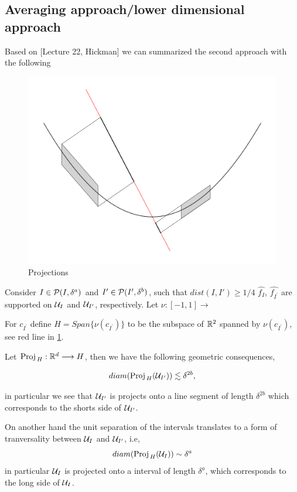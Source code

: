 \subsection{Averaging approach/lower dimensional approach}\label{subsection:Averaging approach}
Based on [Lecture 22, Hickman] we can summarized the second approach with the following  
\begin{figure}[h!]
    \centering
    \includegraphics[scale=0.6]{Pics/Proj1.png}
    \caption{Projections }
    \label{fig:projections}
\end{figure}


Consider $I\in \mathcal{P}(I,\delta^{a})$ and $I^{\prime}\in \mathcal{P}(I^{\prime},\delta^{b})$, such that $dist(I,I')\geq 1/4$ $\hat{f_{I}}$, $\hat{f_{I^{\prime}}}$ are supported on $\mathcal{U}_{I}$ and $\mathcal{U}_{I^{\prime}}$, respectively. Let $\nu:[-1,1]\xrightarrow{}$

For $c_{I^{\prime}}$ define $H = Span\{\nu(c_{I^{\prime}})\}$ to be the subspace of $\mathbb{R}^2$ spanned by $\nu(c_{I^{\prime}})$, see red line in \ref{fig:projections}.

Let $\text{Proj}_{\,H}: \mathbb{R}^{d}\longrightarrow H$, then we have the following geometric consequences,

$$diam(\text{Proj}_{\,H}(\mathcal{U}_{I^{\prime}}))\lesssim \delta^{2b},$$

in particular we see that $\mathcal{U}_{I^{\prime}}$ is projects onto a line segment of length $\delta^{2b}$ which corresponds to the shorts side of $\mathcal{U}_{I^{\prime}}$.

On another hand the unit separation of the intervals translates to a form of tranversality between $\mathcal{U}_{I}$ and $\mathcal{U}_{I^{\prime}}$, i.e,
$$
diam(\text{Proj}_{\,H}(\mathcal{U}_{I}))\sim \delta^{a}
$$
in particular $\mathcal{U}_{I}$ is projected onto a interval of length $\delta^a$, which corresponds to the long side of $\mathcal{U}_{I}$.

